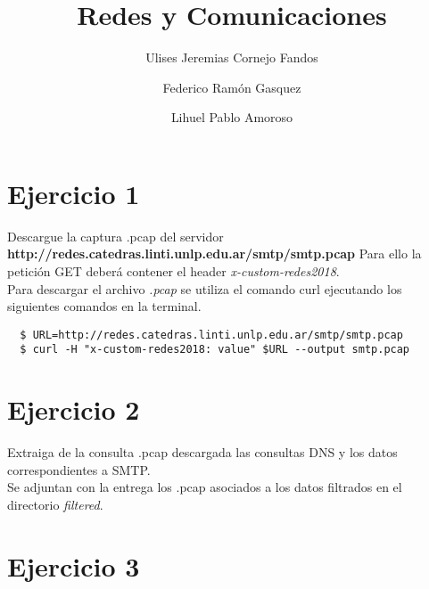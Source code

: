 \documentclass[osajnl,twocolumn,showpacs,superscriptaddress,10pt]{revtex4-1} %
\begin{document}
\title{Redes y Comunicaciones}

\author{Ulises Jeremias Cornejo Fandos}

\author{Federico Ramón Gasquez}

\author{Lihuel Pablo Amoroso}


\maketitle %

\onecolumngrid

\section{Ejercicio 1}

Descargue la captura .pcap del servidor \textbf{http://redes.catedras.linti.unlp.edu.ar/smtp/smtp.pcap} Para ello la petición GET deberá contener el header \textit{x-custom-redes2018}. \\

Para descargar el archivo \textit{.pcap} se utiliza el comando curl ejecutando los siguientes comandos en la terminal.

\begin{verbatim}
  $ URL=http://redes.catedras.linti.unlp.edu.ar/smtp/smtp.pcap
  $ curl -H "x-custom-redes2018: value" $URL --output smtp.pcap
\end{verbatim}

\section{Ejercicio 2}

Extraiga de la consulta .pcap descargada las consultas DNS y los datos correspondientes a SMTP. \\

Se adjuntan con la entrega los .pcap asociados a los datos filtrados en el directorio \textit{filtered}. \\

\section{Ejercicio 3}
\end{document}
